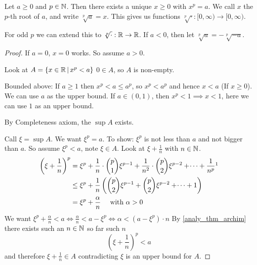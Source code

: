 \documentclass[10pt, a4paper]{article}
\begin{document}
\begin{theorem}
    Let $a \geq 0$ and $p \in \mathbb{N}$.
    Then there exists a unique $x \geq 0$ with $x ^ p = a$.
    We call $x$ the $p$-th root of $a$,
    and write $\sqrt[p]{a} = x$.
    This gives us functions $\sqrt[p]{\cdot} : [0, \infty) \rightarrow [0, \infty)$.

    For odd $p$ we can extend this to $\sqrt[p]{\cdot} : \mathbb{R} \rightarrow \mathbb{R}$.
    If $a < 0$, then let $\sqrt[p]{a} = -\sqrt[p]{-a}$.
    \begin{proof}
        If $a = 0$, $x = 0$ works.
        So assume $a > 0$.

        Look at $A = \{x \in \mathbb{R}\,|\, x ^ p < a\}$
        $0 \in A$, so $A$ is non-empty.

        Bounded above: If $a \geq 1$ then $x ^ p < a \leq a ^ p$,
        so $x ^ p < a ^ p$ and hence $x < a$ (If $x \geq 0$). We can use $a$ as the upper bound.
        If $a \in (0, 1)$, then $x ^ p < 1 \implies x < 1$, here we can use $1$ as an upper bound.
        
        By Completeness axiom, the $\sup A$ exists. 
        
        Call $\xi = \sup A$.
        We want $\xi ^ p = a$.
        To show: $\xi ^ p$ is not less than $a$ and not bigger than $a$.
        So assume $\xi ^ p < a$, note $\xi \in A$.
        Look at $\xi + \frac{1}{n}$ with $n \in \mathbb{N}$.
        \begin{align*}
            \left(\xi + \frac{1}{n}\right) ^ p &= \xi ^ p + \frac{1}{n} \cdot \binom{p}{1} \xi ^ {p - 1} + \frac{1}{n ^ 2} \cdot \binom{p}{2} \xi ^ {p - 2} + \dotsi + \frac{1}{n ^ p}\footnotemark \\
            &\leq \xi ^ p + \frac{1}{n}\left(\binom{p}{2}\xi ^ {p - 1} + \binom{p}{2}\xi ^ {p - 2} + \dotsi + 1\right) \\
            &= \xi ^ p + \frac{\alpha}{n}\quad\text{ with } \alpha > 0
        \end{align*}
        We want $\xi ^ p + \frac{\alpha}{n} < a \iff \frac{\alpha}{n} < a - \xi ^ p \iff \alpha < \left(a - \xi ^ p\right) \cdot n$ By \autoref{analy_thm_archim} there exists such an $n \in \mathbb{N}$
        so far such $n$
        \[
        \left(\xi + \frac{1}{n}\right) ^ p < a
        \]
        and therefore $\xi + \frac{1}{n} \in A$ contradicting $\xi$ is an upper bound for $A$.


\end{proof}
\end{theorem}
\end{document}
